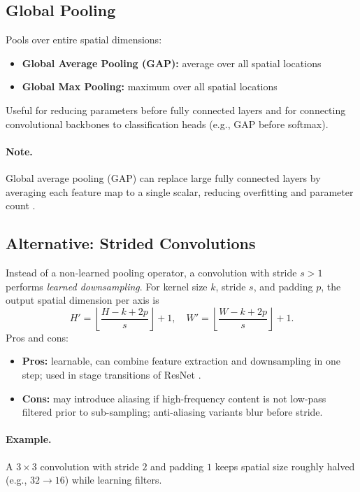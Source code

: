 \subsection{Global Pooling}

Pools over entire spatial dimensions:
\begin{itemize}
    \item \textbf{Global Average Pooling (GAP):} average over all spatial locations
    \item \textbf{Global Max Pooling:} maximum over all spatial locations
\end{itemize}

Useful for reducing parameters before fully connected layers and for connecting convolutional backbones to classification heads (e.g., GAP before softmax).

\paragraph{Note.} Global average pooling (GAP) can replace large fully connected layers by averaging each feature map to a single scalar, reducing overfitting and parameter count \cite{GoodfellowEtAl2016}.

\subsection{Alternative: Strided Convolutions}
\label{subsec:strided-convs}

Instead of a non-learned pooling operator, a convolution with stride $s>1$ performs \emph{learned downsampling}. For kernel size $k$, stride $s$, and padding $p$, the output spatial dimension per axis is
\begin{equation}
H' = \left\lfloor \frac{H - k + 2p}{s} \right\rfloor + 1,\quad W' = \left\lfloor \frac{W - k + 2p}{s} \right\rfloor + 1.
\end{equation}
Pros and cons:
\begin{itemize}
    \item \textbf{Pros:} learnable, can combine feature extraction and downsampling in one step; used in stage transitions of ResNet \cite{He2016}.
    \item \textbf{Cons:} may introduce aliasing if high-frequency content is not low-pass filtered prior to sub-sampling; anti-aliasing variants blur before stride.
\end{itemize}

\paragraph{Example.} A $3\times3$ convolution with stride $2$ and padding $1$ keeps spatial size roughly halved (e.g., $32\to16$) while learning filters.

